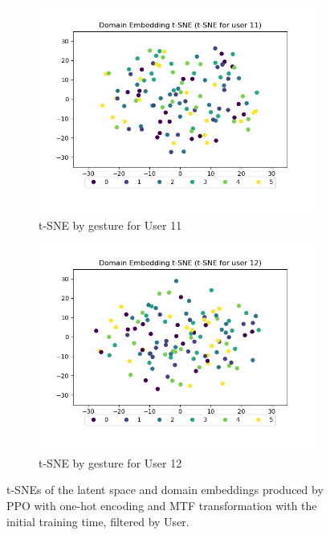 \begin{figure}[b]
\begin{subfigure}{0.3\textwidth}
		\includegraphics[width=\textwidth]{figures/short/short_de_u11}
		\caption{t-SNE by gesture for User 11}
	\end{subfigure}
	\hfill
	\begin{subfigure}{0.3\textwidth}
		\centering
		\includegraphics[width=\textwidth]{figures/short/short_de_u12}
		\caption{t-SNE by gesture for User 12}
	\end{subfigure}
	\hfill
	\caption{t-SNEs of the latent space and domain embeddings produced by PPO with one-hot encoding and MTF transformation with the initial training time, filtered by User.}
\end{figure}

